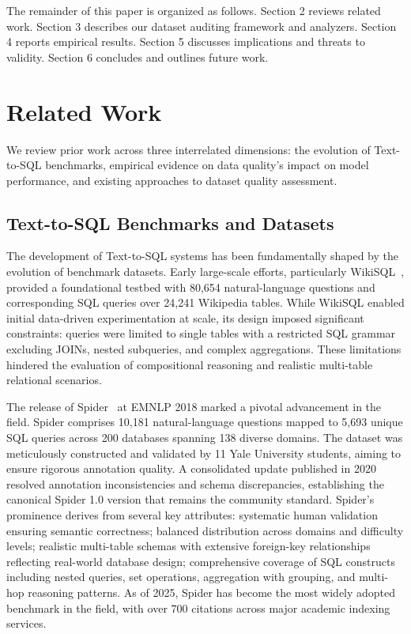 \documentclass[print]{einformatica}
\begin{document}
The remainder of this paper is organized as follows. Section 2 reviews related work. Section 3 describes our dataset auditing framework and analyzers. Section 4 reports empirical results. Section 5 discusses implications and threats to validity. Section 6 concludes and outlines future work.

\section{Related Work}\label{sec:RelatedWork}

We review prior work across three interrelated dimensions: the evolution of Text-to-SQL benchmarks, empirical evidence on data quality's impact on model performance, and existing approaches to dataset quality assessment.

\subsection{Text-to-SQL Benchmarks and Datasets}

The development of Text-to-SQL systems has been fundamentally shaped by the evolution of benchmark datasets. Early large-scale efforts, particularly WikiSQL~\cite{zhong2017seq2sql}, provided a foundational testbed with 80,654 natural-language questions and corresponding SQL queries over 24,241 Wikipedia tables. While WikiSQL enabled initial data-driven experimentation at scale, its design imposed significant constraints: queries were limited to single tables with a restricted SQL grammar excluding JOINs, nested subqueries, and complex aggregations. These limitations hindered the evaluation of compositional reasoning and realistic multi-table relational scenarios.

The release of Spider~\cite{yu2018spider} at EMNLP 2018 marked a pivotal advancement in the field. Spider comprises 10,181 natural-language questions mapped to 5,693 unique SQL queries across 200 databases spanning 138 diverse domains. The dataset was meticulously constructed and validated by 11 Yale University students, aiming to ensure rigorous annotation quality. A consolidated update published in 2020 resolved annotation inconsistencies and schema discrepancies, establishing the canonical Spider 1.0 version that remains the community standard. Spider's prominence derives from several key attributes: systematic human validation ensuring semantic correctness; balanced distribution across domains and difficulty levels; realistic multi-table schemas with extensive foreign-key relationships reflecting real-world database design; comprehensive coverage of SQL constructs including nested queries, set operations, aggregation with grouping, and multi-hop reasoning patterns. As of 2025, Spider has become the most widely adopted benchmark in the field, with over 700 citations across major academic indexing services.
\end{document}
